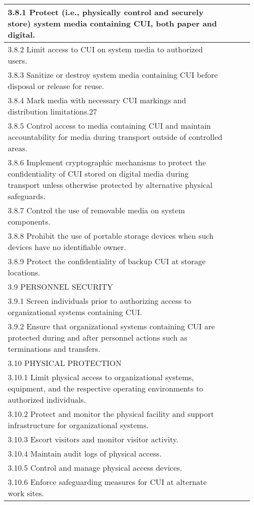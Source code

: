 \begin{longtable} {|p{}|p{}|p{}|p{} |}
{3.8.1 Protect (i.e., physically control and securely store) system media containing CUI, both paper and digital.}&&& \\ \hline
{3.8.2 Limit access to CUI on system media to authorized users.}&&& \\ \hline
{3.8.3 Sanitize or destroy system media containing CUI before disposal or release for reuse.}&&& \\ \hline
{3.8.4 Mark media with necessary CUI markings and distribution limitations.27}&&& \\ \hline
{3.8.5 Control access to media containing CUI and maintain accountability for media during transport outside of controlled areas.}&&& \\ \hline
{3.8.6 Implement cryptographic mechanisms to protect the confidentiality of CUI stored on digital media during transport unless otherwise protected by alternative physical safeguards.}&&& \\ \hline
{3.8.7 Control the use of removable media on system components.}&&& \\ \hline
{3.8.8 Prohibit the use of portable storage devices when such devices have no identifiable owner.}&&& \\ \hline
{3.8.9 Protect the confidentiality of backup CUI at storage locations.}&&& \\ \hline
{3.9 PERSONNEL SECURITY}&&& \\ \hline
{3.9.1 Screen individuals prior to authorizing access to organizational systems containing CUI.}&&& \\ \hline
{3.9.2 Ensure that organizational systems containing CUI are protected during and after personnel actions such as terminations and transfers.}&&& \\ \hline
{3.10 PHYSICAL PROTECTION}&&& \\ \hline
{3.10.1 Limit physical access to organizational systems, equipment, and the respective operating environments to authorized individuals.}&&& \\ \hline
{3.10.2 Protect and monitor the physical facility and support infrastructure for organizational systems.}&&& \\ \hline
{3.10.3 Escort visitors and monitor visitor activity.}&&& \\ \hline
{3.10.4 Maintain audit logs of physical access.}&&& \\ \hline
{3.10.5 Control and manage physical access devices.}&&& \\ \hline
{3.10.6 Enforce safeguarding measures for CUI at alternate work sites.}&&& \\ \hline

\end{longtable}
